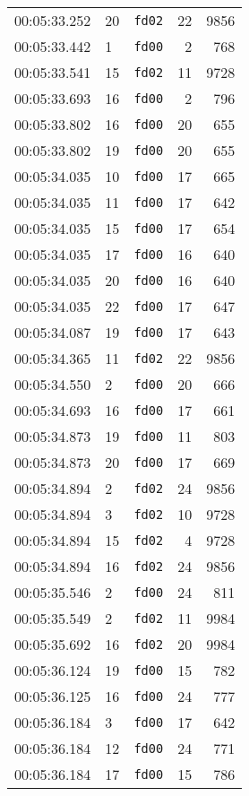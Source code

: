 \documentclass{article}
\begin{document}
\begin{longtable}{lllrr}
00:05:33.252 & 20 & \texttt{fd02} & 22 & 9856 \\
00:05:33.442 & 1 & \texttt{fd00} & 2 & 768 \\
00:05:33.541 & 15 & \texttt{fd02} & 11 & 9728 \\
00:05:33.693 & 16 & \texttt{fd00} & 2 & 796 \\
00:05:33.802 & 16 & \texttt{fd00} & 20 & 655 \\
00:05:33.802 & 19 & \texttt{fd00} & 20 & 655 \\
00:05:34.035 & 10 & \texttt{fd00} & 17 & 665 \\
00:05:34.035 & 11 & \texttt{fd00} & 17 & 642 \\
00:05:34.035 & 15 & \texttt{fd00} & 17 & 654 \\
00:05:34.035 & 17 & \texttt{fd00} & 16 & 640 \\
00:05:34.035 & 20 & \texttt{fd00} & 16 & 640 \\
00:05:34.035 & 22 & \texttt{fd00} & 17 & 647 \\
00:05:34.087 & 19 & \texttt{fd00} & 17 & 643 \\
00:05:34.365 & 11 & \texttt{fd02} & 22 & 9856 \\
00:05:34.550 & 2 & \texttt{fd00} & 20 & 666 \\
00:05:34.693 & 16 & \texttt{fd00} & 17 & 661 \\
00:05:34.873 & 19 & \texttt{fd00} & 11 & 803 \\
00:05:34.873 & 20 & \texttt{fd00} & 17 & 669 \\
00:05:34.894 & 2 & \texttt{fd02} & 24 & 9856 \\
00:05:34.894 & 3 & \texttt{fd02} & 10 & 9728 \\
00:05:34.894 & 15 & \texttt{fd02} & 4 & 9728 \\
00:05:34.894 & 16 & \texttt{fd02} & 24 & 9856 \\
00:05:35.546 & 2 & \texttt{fd00} & 24 & 811 \\
00:05:35.549 & 2 & \texttt{fd02} & 11 & 9984 \\
00:05:35.692 & 16 & \texttt{fd02} & 20 & 9984 \\
00:05:36.124 & 19 & \texttt{fd00} & 15 & 782 \\
00:05:36.125 & 16 & \texttt{fd00} & 24 & 777 \\
00:05:36.184 & 3 & \texttt{fd00} & 17 & 642 \\
00:05:36.184 & 12 & \texttt{fd00} & 24 & 771 \\
00:05:36.184 & 17 & \texttt{fd00} & 15 & 786 \\

\end{longtable}
\end{document}
